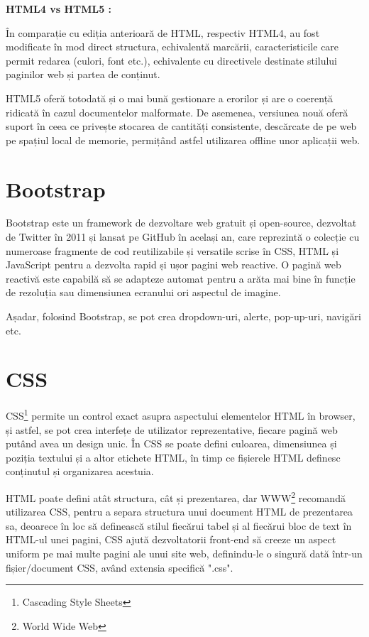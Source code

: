 \textbf{ HTML4 vs HTML5 :}\newline

În comparație cu ediția anterioară de HTML, respectiv HTML4, au fost modificate în mod direct structura, echivalentă marcării, caracteristicile care permit redarea (culori, font etc.), echivalente cu directivele destinate stilului paginilor web și partea de conținut.\newline

HTML5 oferă totodată și o mai bună gestionare a erorilor și are o coerență ridicată în cazul documentelor malformate. De asemenea, versiunea nouă  oferă suport în ceea ce privește stocarea de cantități consistente, descărcate de pe web pe spațiul local de memorie, permițând astfel utilizarea offline unor aplicații web.
\newline

\section{Bootstrap}

Bootstrap este un framework de dezvoltare web gratuit și open-source, dezvoltat de Twitter în 2011 și lansat pe GitHub în același an, care reprezintă o colecție cu numeroase fragmente de cod reutilizabile și versatile scrise în CSS, HTML și JavaScript pentru a dezvolta rapid și ușor pagini web reactive.\newline
O pagină web reactivă este capabilă să se adapteze automat pentru a arăta mai bine în funcție de rezoluția sau dimensiunea ecranului ori aspectul de imagine.\newline

Așadar, folosind Bootstrap, se pot crea dropdown-uri, alerte, pop-up-uri, navigări etc.

\section{CSS}

CSS\footnote{Cascading Style Sheets} permite un control exact asupra aspectului elementelor HTML în browser, și astfel, se pot crea interfețe de utilizator reprezentative, fiecare pagină web putând avea un design unic. În CSS se poate defini culoarea, dimensiunea și poziția textului și a altor etichete HTML, în timp ce fișierele HTML definesc conținutul și organizarea acestuia.\newline

HTML poate defini atât structura, cât și prezentarea, dar WWW\footnote{World Wide Web} recomandă utilizarea CSS, pentru a separa structura unui document HTML de prezentarea sa, deoarece în loc să definească stilul fiecărui tabel și al fiecărui bloc de text în HTML-ul unei pagini, CSS ajută dezvoltatorii front-end să creeze un aspect uniform pe mai multe pagini ale unui site web, definindu-le o singură dată într-un fișier/document CSS, având extensia specifică ".css".

